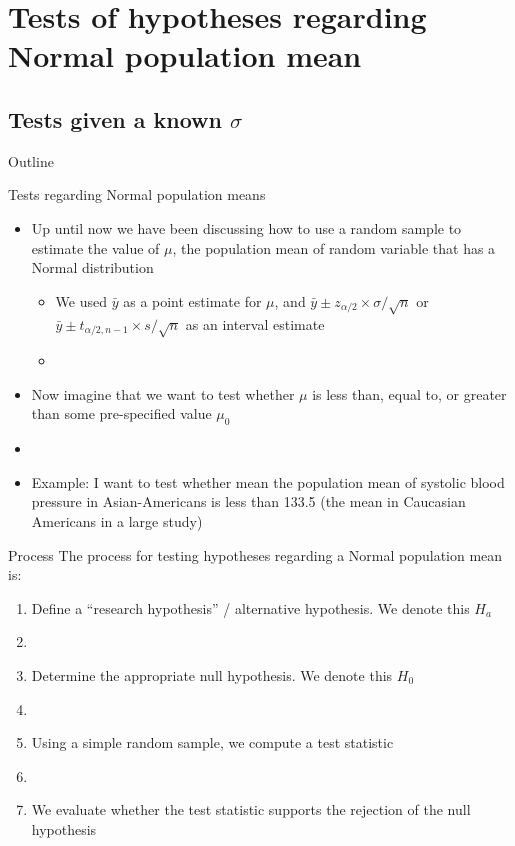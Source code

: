 \documentclass[xcolor=dvipsnames]{beamer}
\begin{document}
\section{Tests of hypotheses regarding Normal population mean}

\subsection{Tests given a known $\sigma$}
\begin{frame}{Outline}
	\tableofcontents[currentsection,subsectionstyle=show/shaded/hide]
\end{frame}

\begin{frame}{Tests regarding Normal population means}
	\begin{itemize}
		\item Up until now we have been discussing how to use a random sample to estimate the value of $\mu$, the population mean of random variable that has a Normal distribution  \pause
		\begin{itemize}
			\item We used $\bar{y}$ as a point estimate for $\mu$, and $\bar{y} \pm z_{\alpha / 2} \times \sigma / \sqrt{n}$ or $\bar{y} \pm t_{\alpha / 2, n - 1} \times s / \sqrt{n}$ as an interval estimate
			\item[]
		\end{itemize}
	\item Now imagine that we want to test whether $\mu$ is less than, equal to, or greater than some pre-specified value $\mu_0$  \pause
	\item[]
	\item Example: I want to test whether mean the population mean of systolic blood pressure in Asian-Americans is less than 133.5 (the mean in Caucasian Americans in a large study)
	
	\end{itemize}
\end{frame}

\begin{frame}{Process}
	The process for testing hypotheses regarding a Normal population mean is: 
	\begin{enumerate}
		\item Define a ``research hypothesis'' / alternative hypothesis. We denote this $H_a$  \pause
		\item[]
		\item Determine the appropriate null hypothesis. We denote this $H_0$  \pause
		\item[]
		\item Using a simple random sample, we compute a test statistic  \pause
		\item[]
		\item We evaluate whether the test statistic supports the rejection of the null hypothesis
	\end{enumerate}
\end{frame}
\end{document}
